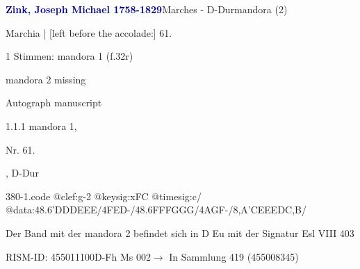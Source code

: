 \documentclass[twocolumn]{book}
\begin{document}
\par \vspace{7pt} \textcolor{darkblue}{\textbf{Zink, Joseph Michael  1758-1829}}\hfillplus{\textbf{[380]}}\newline Marches - D-Dur\newline mandora (2)
\par \begin{itshape}[f.32r, at left:] Marchia | [left before the accolade:] 61.\end{itshape} 
\par \textcolor{darkblue}{}  1 Stimmen: mandora 1  (f.32r)\newline \begin{small} mandora 2 missing\end{small} \newline Autograph manuscript
\par 1.1.1  mandora 1, \begin{itshape}Nr. 61.\end{itshape}, D-Dur  
\begin{filecontents*}{380-1.code}
@clef:g-2
@keysig:xFC
@timesig:c/
@data:48.6'D{DD}E{EE}/4FED-/48.6F{FF}G{GG}/4AGF-/8,A'CEEEDC,B/
\end{filecontents*}
\newline
%
\par Der Band mit der mandora 2 befindet sich in D Eu mit der Signatur Esl VIII 403
\par RISM-ID: 455011100\newline D-Fh  Ms 002\newline $\rightarrow$ In Sammlung 419 (455008345)
      
\end{document}

